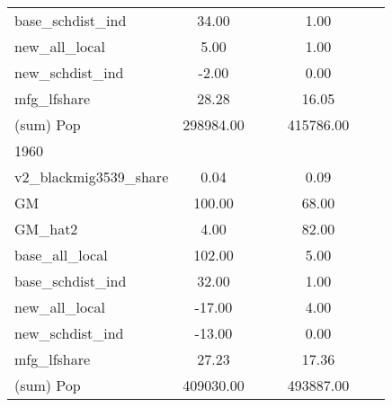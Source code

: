 \begin{table}[htbp]
\begin{tabular}{l*{2}{ccc}}
base\_schdist\_ind    &       34.00&            &            &        1.00&            &            \\
new\_all\_local       &        5.00&            &            &        1.00&            &            \\
new\_schdist\_ind     &       -2.00&            &            &        0.00&            &            \\
mfg\_lfshare         &       28.28&            &            &       16.05&            &            \\
(sum) Pop           &   298984.00&            &            &   415786.00&            &            \\
\midrule
1960                &            &            &            &            &            &            \\
v2\_blackmig3539\_share&        0.04&            &            &        0.09&            &            \\
GM                  &      100.00&            &            &       68.00&            &            \\
GM\_hat2             &        4.00&            &            &       82.00&            &            \\
base\_all\_local      &      102.00&            &            &        5.00&            &            \\
base\_schdist\_ind    &       32.00&            &            &        1.00&            &            \\
new\_all\_local       &      -17.00&            &            &        4.00&            &            \\
new\_schdist\_ind     &      -13.00&            &            &        0.00&            &            \\
mfg\_lfshare         &       27.23&            &            &       17.36&            &            \\
(sum) Pop           &   409030.00&            &            &   493887.00&            &            \\
\bottomrule
\end{tabular}
\end{table}
